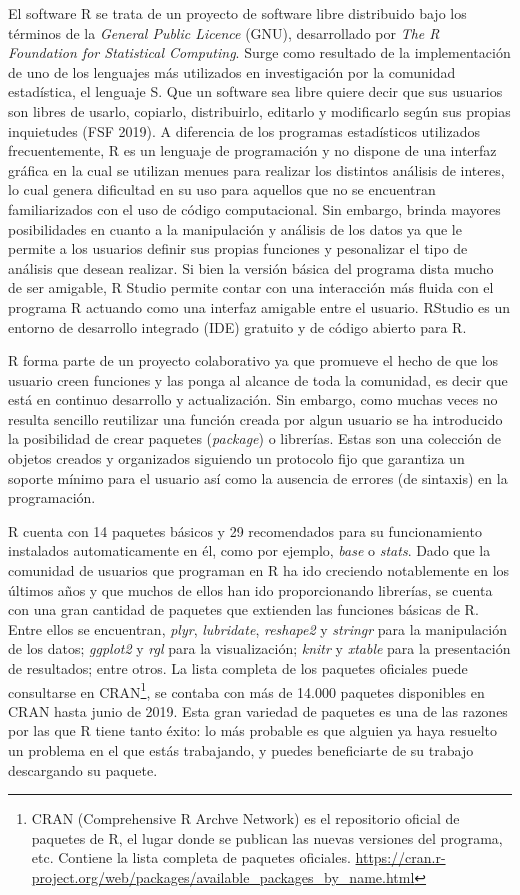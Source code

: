 El software R se trata de un proyecto de software libre distribuido bajo los términos de la \emph{General Public Licence} (GNU), desarrollado por \emph{The R Foundation for Statistical Computing}. Surge como resultado de la implementación de uno de los lenguajes más utilizados en investigación por la comunidad estadística, el lenguaje S. Que un software sea libre quiere decir que sus usuarios son libres de usarlo, copiarlo, distribuirlo, editarlo y modificarlo según sus propias inquietudes (FSF 2019). A diferencia de los programas estadísticos utilizados frecuentemente, R es un lenguaje de programación y no dispone de una interfaz gráfica en la cual se utilizan menues para realizar los distintos análisis de interes, lo cual genera dificultad en su uso para aquellos que no se encuentran familiarizados con el uso de código computacional. Sin embargo, brinda mayores posibilidades en cuanto a la manipulación y análisis de los datos ya que le permite a los usuarios definir sus propias funciones y pesonalizar el tipo de análisis que desean realizar. Si bien la versión básica del programa dista mucho de ser amigable, R Studio permite contar con una interacción más fluida con el programa R actuando como una interfaz amigable entre el usuario.  RStudio es un entorno de desarrollo integrado (IDE) gratuito y de código abierto para R. 

R forma parte de un proyecto colaborativo ya que promueve el hecho de que los usuario creen funciones y las ponga al alcance de toda la comunidad, es decir que está en continuo desarrollo y actualización.  Sin embargo, como muchas veces no resulta sencillo reutilizar una función creada por algun usuario se ha introducido la posibilidad de crear paquetes (\emph{package}) o librerías. Estas son una colección de objetos creados y organizados siguiendo un protocolo fijo que garantiza un soporte mínimo para el usuario así como la ausencia de errores (de sintaxis) en la programación.

R cuenta con 14 paquetes básicos y 29 recomendados para su funcionamiento instalados automaticamente en él, como por ejemplo, \emph{base} o \emph{stats}. Dado que la comunidad de usuarios que programan en R ha ido creciendo notablemente en los últimos años y que muchos de ellos han ido proporcionando librerías, se cuenta con una gran cantidad de paquetes que extienden las funciones básicas de R. Entre ellos se encuentran, \emph{plyr}, \emph{lubridate}, \emph{reshape2} y \emph{stringr} para la manipulación de los datos; \emph{ggplot2} y \emph{rgl} para la visualización; \emph{knitr} y \emph{xtable} para la presentación de resultados; entre otros. La lista completa de los paquetes oficiales puede consultarse en CRAN\footnote{CRAN (Comprehensive R Archve Network) es el repositorio oficial de paquetes de R, el lugar donde se publican las nuevas versiones del programa, etc. Contiene la lista completa de paquetes oficiales. \url{https://cran.r-project.org/web/packages/available_packages_by_name.html}}, se contaba con más de 14.000 paquetes disponibles en CRAN hasta junio de 2019. Esta gran variedad de paquetes es una de las razones por las que R tiene tanto éxito: lo más probable es que alguien ya haya resuelto un problema en el que estás trabajando, y puedes beneficiarte de su trabajo descargando su paquete.

